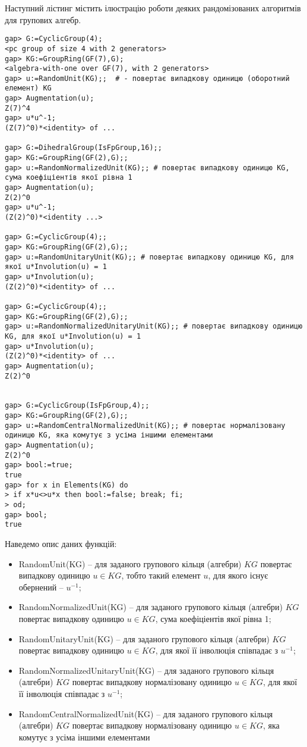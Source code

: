 Наступний лістинг містить ілюстрацію роботи деяких рандомізованих алгоритмів для групових алгебр.

\begin{lstlisting}[label=units,caption=Рандомізовані алгоритми для групових алгебр]
gap> G:=CyclicGroup(4);
<pc group of size 4 with 2 generators>
gap> KG:=GroupRing(GF(7),G);
<algebra-with-one over GF(7), with 2 generators>
gap> u:=RandomUnit(KG);;  # - повертає випадкову одиницю (оборотний елемент) KG 
gap> Augmentation(u);
Z(7)^4
gap> u*u^-1;
(Z(7)^0)*<identity> of ...

gap> G:=DihedralGroup(IsFpGroup,16);;
gap> KG:=GroupRing(GF(2),G);;
gap> u:=RandomNormalizedUnit(KG);; # повертає випадкову одиницю KG, сума коефіціентів якої рівна 1
gap> Augmentation(u);
Z(2)^0
gap> u*u^-1;
(Z(2)^0)*<identity ...>

gap> G:=CyclicGroup(4);;
gap> KG:=GroupRing(GF(2),G);;
gap> u:=RandomUnitaryUnit(KG);; # повертає випадкову одиницю KG, для якої u*Involution(u) = 1
gap> u*Involution(u);
(Z(2)^0)*<identity> of ...

gap> G:=CyclicGroup(4);;
gap> KG:=GroupRing(GF(2),G);;
gap> u:=RandomNormalizedUnitaryUnit(KG);; # повертає випадкову одиницю KG, для якої u*Involution(u) = 1
gap> u*Involution(u);
(Z(2)^0)*<identity> of ...
gap> Augmentation(u);
Z(2)^0


gap> G:=CyclicGroup(IsFpGroup,4);;
gap> KG:=GroupRing(GF(2),G);;
gap> u:=RandomCentralNormalizedUnit(KG);; # повертає нормалізовану одиницю KG, яка комутує з усіма іншими елементами
gap> Augmentation(u);
Z(2)^0
gap> bool:=true;
true
gap> for x in Elements(KG) do
> if x*u<>u*x then bool:=false; break; fi;
> od;
gap> bool;
true
\end{lstlisting}

Наведемо опис даних функцій:
\begin{itemize}[noitemsep,partopsep=0pt,topsep=0pt,parsep=0pt]
\item \textsf{RandomUnit(KG)} -- для заданого групового кільця (алгебри) $KG$ повертає випадкову одиницю $u \in KG$, тобто такий елемент $u$, для якого існує обернений -- $u^{-1}$;
\item \textsf{RandomNormalizedUnit(KG)} -- для заданого групового кільця (алгебри) $KG$ повертає випадкову одиницю $u \in KG$, сума коефіціентів якої рівна 1;
\item \textsf{RandomUnitaryUnit(KG)} -- для заданого групового кільця (алгебри) $KG$ повертає випадкову одиницю $u \in KG$, для якої її інволюція співпадає з $u^{-1}$;
\item \textsf{RandomNormalizedUnitaryUnit(KG)} -- для заданого групового кільця (алгебри) $KG$ повертає випадкову нормалізовану одиницю $u \in KG$, для якої її інволюція співпадає з $u^{-1}$;
\item \textsf{RandomCentralNormalizedUnit(KG)} -- для заданого групового кільця (алгебри) $KG$ повертає випадкову нормалізовану одиницю $u \in KG$, яка комутує з усіма іншими елементами

\end{itemize}

